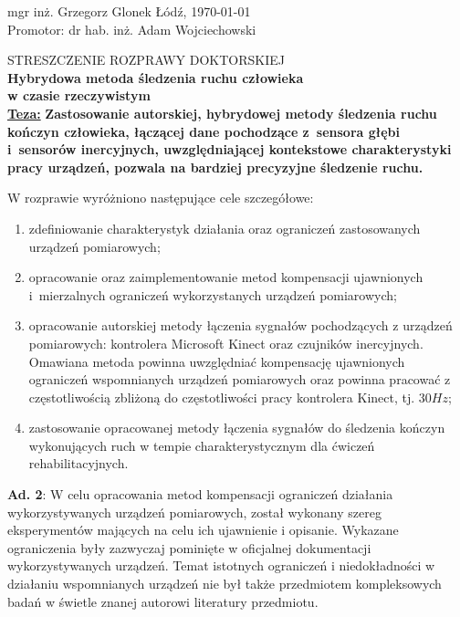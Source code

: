 \documentclass[10pt,a4paper]{article}
\author{Grzegorz Glonek}
\begin{document}
	

	\begin{FlushLeft}
mgr inż. Grzegorz Glonek \hfill 	Łódź, \today \\					
	Promotor: dr hab. inż. Adam Wojciechowski
\end{FlushLeft}

\vspace*{2cm}
\Centering
STRESZCZENIE ROZPRAWY DOKTORSKIEJ\\
\vspace*{0.5cm}
\textbf{Hybrydowa metoda śledzenia ruchu człowieka \\w czasie rzeczywistym}\\

\vspace*{1.5cm}
\justify
\textbf{\underline{Teza:}} \textbf{Zastosowanie autorskiej, hybrydowej metody śledzenia ruchu kończyn człowieka, łączącej dane pochodzące z~sensora głębi i~sensorów inercyjnych, uwzględniającej kontekstowe charakterystyki pracy urządzeń, pozwala na bardziej precyzyjne śledzenie ruchu.}

\vspace*{1cm}
	W rozprawie wyróżniono następujące cele szczegółowe:
	\begin{enumerate}[1. ]
		\item zdefiniowanie charakterystyk działania oraz ograniczeń zastosowanych urządzeń pomiarowych;
	
		\item opracowanie oraz zaimplementowanie metod kompensacji ujawnionych i~mierzalnych ograniczeń wykorzystanych urządzeń pomiarowych;
			\item opracowanie autorskiej metody łączenia sygnałów pochodzących z urządzeń pomiarowych: kontrolera Microsoft Kinect oraz czujników inercyjnych. Omawiana metoda powinna uwzględniać kompensację ujawnionych ograniczeń wspomnianych urządzeń pomiarowych oraz powinna pracować z częstotliwością zbliżoną do częstotliwości pracy kontrolera Kinect, tj. $30Hz$;		
		\item zastosowanie opracowanej metody łączenia sygnałów do śledzenia kończyn wykonujących ruch w tempie charakterystycznym dla ćwiczeń rehabilitacyjnych.
	\end{enumerate}

\textbf{Ad. 2}: W celu opracowania metod kompensacji ograniczeń działania wykorzystywanych urządzeń pomiarowych, został wykonany szereg eksperymentów mających na celu ich ujawnienie i opisanie. Wykazane ograniczenia były zazwyczaj pominięte w oficjalnej dokumentacji wykorzystywanych urządzeń. Temat istotnych ograniczeń i niedokładności w działaniu wspomnianych urządzeń nie był także przedmiotem kompleksowych badań w świetle znanej autorowi literatury przedmiotu.
\end{document}
